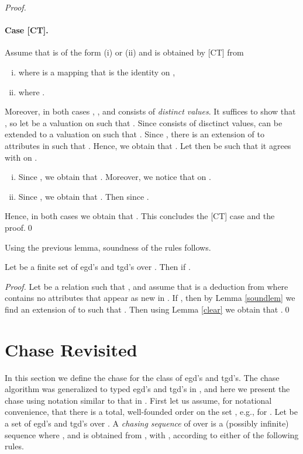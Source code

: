 \documentclass[envcountset]{llncs}
\begin{document}
\begin{proof}
\paragraph{\textbf{Case [CT].}} Assume that  is of the form (i)  or (ii)  and  is obtained by [CT] from 
\begin{enumerate}[(i)]
\item  where   is a mapping   that is the identity on ,
\item  where .
\end{enumerate}
Moreover, in both cases , ,  and  consists of \emph{distinct values}. It suffices to show that , so let  be a valuation on  such that . Since  consists of disctinct values,  can be extended to a valuation  on  such that . Since , there is an extension  of  to attributes in  such that . Hence, we obtain that . Let then  be such that it agrees with  on .
\begin{enumerate}[(i)]

\item  Since ,  we obtain that . Moreover, we notice that  on . 

\item Since  , we obtain that . Then  since  . 

\end{enumerate}
Hence, in both cases we obtain that . This concludes the [CT] case and the proof.\qed


   

\end{proof}

Using the previous lemma,  soundness of the rules follows.

\begin{theorem}
Let  be a finite set of egd's and tgd's over . Then  if .
\end{theorem}
\begin{proof}
Let  be a relation such that , and assume that  is a deduction from  where  contains no attributes that appear as new in .  If , then by Lemma   \ref{soundlem}  we find an extension  of  to  such that . Then using Lemma \ref{clear} we obtain that .\qed
\end{proof}



\section{Chase Revisited}\label{chasing}
In this section we define the chase for the class of egd's and tgd's. The chase algorithm was generalized to typed egd's and tgd's in \cite{beeri84}, and here we present the chase using notation similar to that in \cite{abiteboul95}. First let us assume, for notational convenience,  that there is a total, well-founded order  on the set , e.g.,  for . Let  be a set of egd's and tgd's over . A \emph{chasing sequence} of  over  is a (possibly infinite) sequence  where 
, and
 is obtained from , with , according to either of the following rules.
\end{document}
